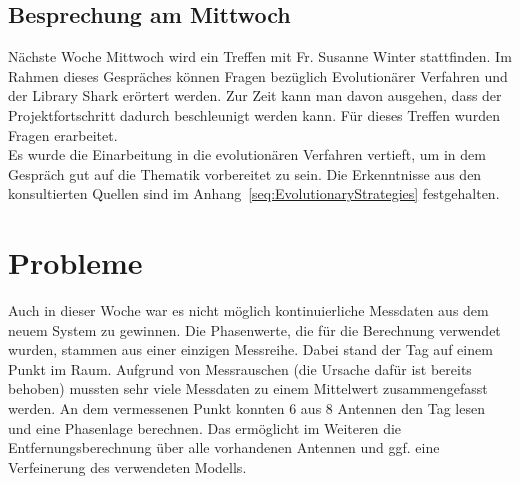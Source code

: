 \documentclass[a4paper,12pt,fleqn]{article}
\begin{document}
\subsection{Besprechung am Mittwoch}
Nächste Woche Mittwoch wird ein Treffen mit Fr. Susanne Winter stattfinden. Im Rahmen dieses Gespräches können Fragen bezüglich Evolutionärer Verfahren und der Library Shark erörtert werden. Zur Zeit kann man davon ausgehen, dass der Projektfortschritt dadurch beschleunigt werden kann. Für dieses Treffen wurden Fragen erarbeitet.\\
Es wurde die Einarbeitung in die evolutionären Verfahren vertieft, um in dem Gespräch gut auf die Thematik vorbereitet zu sein. Die Erkenntnisse aus den konsultierten Quellen sind im Anhang~\ref{seq:EvolutionaryStrategies} festgehalten.

\section{Probleme}
\label{sec:Problems}
Auch in dieser Woche war es nicht möglich kontinuierliche Messdaten aus dem neuem System zu gewinnen. Die Phasenwerte, die für die Berechnung verwendet wurden, stammen aus einer einzigen Messreihe. Dabei stand der Tag auf einem Punkt im Raum. Aufgrund von Messrauschen (die Ursache dafür ist bereits behoben) mussten sehr viele Messdaten zu einem Mittelwert zusammengefasst werden. An dem vermessenen Punkt konnten 6 aus 8 Antennen den Tag lesen und eine Phasenlage berechnen. Das ermöglicht im Weiteren die Entfernungsberechnung über alle vorhandenen Antennen und ggf. eine Verfeinerung des verwendeten Modells.



\newpage


\end{document}

